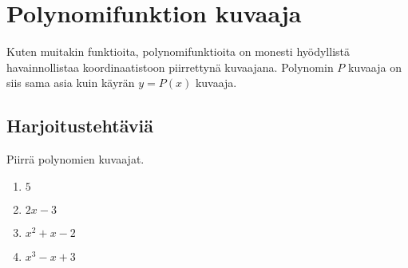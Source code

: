\chapter{Polynomifunktion kuvaaja}
Kuten muitakin funktioita, polynomifunktioita on monesti hyödyllistä
havainnollistaa koordinaatistoon piirrettynä kuvaajana. Polynomin
$P$ kuvaaja on siis sama asia kuin käyrän $y = P(x)$ kuvaaja.

\begin{kuvaajapohja}{1.5}{-2}{2}{-3}{3}
\end{kuvaajapohja}

\section{Harjoitustehtäviä}
\begin{tehtava}
	Piirrä polynomien kuvaajat.
	\begin{enumerate}
		\item $5$
		\item $2x-3$
		\item $x^2+x-2$
		\item $x^3-x+3$
	\end{enumerate}
	
	\begin{vastaus}
	\end{vastaus}
\end{tehtava}
